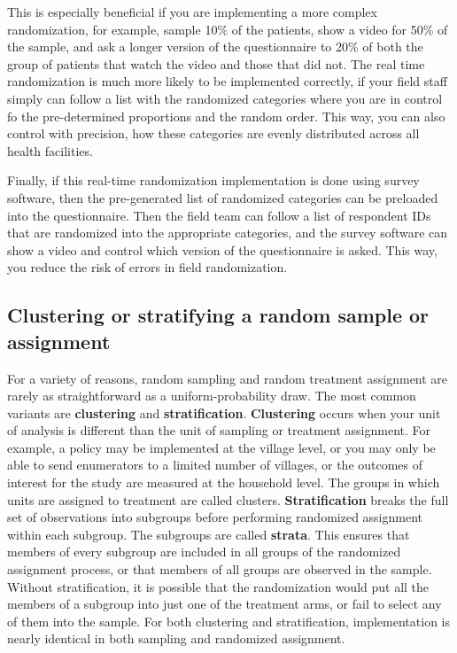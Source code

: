 This is especially beneficial if you are implementing a more complex randomization,
for example, sample 10\% of the patients, show a video for 50\% of the sample, 
and ask a longer version of the questionnaire to 20\% of both 
the group of patients that watch the video and those that did not.
The real time randomization is much more likely to be implemented correctly,
if your field staff simply can follow a list with the randomized categories
where you are in control fo the pre-determined proportions and the random order.
This way, you can also control with precision,
how these categories are evenly distributed across all health facilities.

Finally, if this real-time randomization implementation is done using survey software,
then the pre-generated list of randomized categories can be preloaded
into the questionnaire.
Then the field team can follow a list of respondent IDs 
that are randomized into the appropriate categories,
and the survey software can show a video and control which version of the questionnaire is asked.
This way, you reduce the risk of errors in field randomization.



\subsection{Clustering or stratifying a random sample or assignment}

For a variety of reasons, random sampling and random treatment assignment
are rarely as straightforward as a uniform-probability draw.
The most common variants are \textbf{clustering} and \textbf{stratification}.\cite{athey2017econometrics}
\textbf{Clustering} occurs when your unit of analysis is different
than the unit of sampling or treatment assignment.
For example, a policy may be implemented at the village level,
or you may only be able to send enumerators to a limited number of villages,
or the outcomes of interest for the study are measured at the household level.
The groups in which units are assigned to treatment are called clusters.
\textbf{Stratification} breaks the full set of observations into subgroups
before performing randomized assignment within each subgroup.
The subgroups are called \textbf{strata}.
This ensures that members of every subgroup
are included in all groups of the randomized assignment process,
or that members of all groups are observed in the sample.
Without stratification, it is possible that the randomization
would put all the members of a subgroup into just one of the treatment arms,
or fail to select any of them into the sample.
For both clustering and stratification,
implementation is nearly identical in both sampling and randomized assignment.

